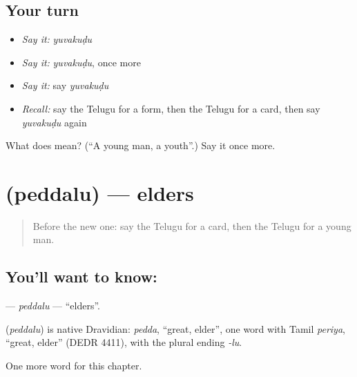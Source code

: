 \subsection*{Your turn}
\begin{itemize}
\raggedright
  \item \emph{Say it:} \emph{yuvakuḍu}
  \item \emph{Say it:} \emph{yuvakuḍu}, once more
  \item \emph{Say it:} say \emph{yuvakuḍu}
  \item \emph{Recall:} say the Telugu for a form, then the Telugu for a card, then say \emph{yuvakuḍu} again
\end{itemize}

\begin{tcolorbox}[breakable,colback=teal!4,colframe=teal!35!black,title={Before you move on}]
What does  mean? (\textquotedblleft{}A young man, a youth\textquotedblright{}.) Say it once more.
\end{tcolorbox}
\section[\texorpdfstring{\te{పెద్దలు} (peddalu)}{పెద్దలు (peddalu)}]{ (peddalu) — elders}

\label{lesson:TE-C227-peddalu}



\begin{quote}
Before the new one: say the Telugu for a card, then the Telugu for a young man.
\end{quote}

\subsection*{You'll want to know: }
\textbf{} — \emph{peddalu} — \textquotedblleft{}elders\textquotedblright{}.

\begin{cousinweb}
\textbf{} (\emph{peddalu}) is native Dravidian: \emph{pedda}, \textquotedblleft{}great, elder\textquotedblright{}, one word with Tamil \emph{periya}, \textquotedblleft{}great, elder\textquotedblright{} (DEDR 4411), with the plural ending \emph{-lu}.
\end{cousinweb}

\begin{grammarlens}[title={What you've built}]
One more word for this chapter.
\end{grammarlens}

